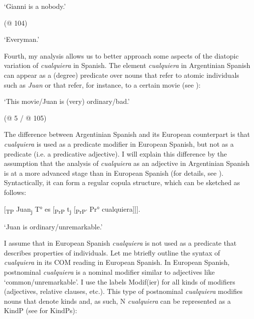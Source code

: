 {
\glt ‘Gianni is a nobody.’

  (@ 104)
\z 

\glt ‘Everyman.’
\z

Fourth, my analysis allows us to better approach some aspects of the diatopic variation of \textit{cualquiera} in Spanish. The element \textit{cualquiera} in Argentinian Spanish can appear as a (degree) predicate over nouns that refer to atomic individuals such as \textit{Juan} or that refer, for instance, to a certain movie (see ):

\glt ‘This movie/Juan is (very) ordinary/bad.’

  (@ 5 / @ 105)
\z

The difference between Argentinian Spanish and its European counterpart is that \textit{cualquiera} is used as a predicate modifier in European Spanish, but not as a predicate (i.e. a predicative adjective). I will explain this difference by the assumption that the analysis of \textit{cualquiera} as an adjective in Argentinian Spanish is at a more advanced stage than in European Spanish (for details, see ). Syntactically, it can form a regular copula structure, which can be sketched as follows:

\ea \label{ex:key:182} %
  [\textsubscript{TP} Juan\textsubscript{j} T° es [\textsubscript{PrP} t\textsubscript{j} [\textsubscript{PrP'} Pr° cualquiera]]].

\glt ‘Juan is ordinary/unremarkable.’
\z

I assume that in European Spanish \textit{cualquiera} is not used as a predicate that describes properties of individuals. Let me btriefly outline the syntax of \textit{cualquiera} in its COM reading in European Spanish. In European Spanish, postnominal \textit{cualquiera} is a nominal modifier similar to adjectives like ‘common/unremarkable’. I use the labels Modif(ier) for all kinds of modifiers (adjectives, relative clauses, etc.). This type of postnominal \textit{cualquiera} modifies nouns that denote kinds and, as such, N \textit{cualquiera} can be represented as a KindP (see \citealt{Zamparelli2000} for KindPs):

}
